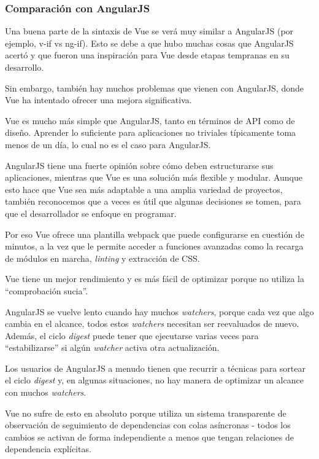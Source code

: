 \subsubsection*{Comparación con AngularJS}
Una buena parte de la sintaxis de Vue se verá muy similar a AngularJS (por ejemplo, v-if vs ng-if). Esto se debe a que hubo muchas cosas que AngularJS acertó y que fueron una inspiración para Vue desde etapas tempranas en su desarrollo.


Sin embargo, también hay muchos problemas que vienen con AngularJS, donde Vue ha intentado ofrecer una mejora significativa.


Vue es mucho más simple que AngularJS, tanto en términos de API como de diseño. Aprender lo suficiente para aplicaciones no triviales típicamente toma menos de un día, lo cual no es el caso para AngularJS.


AngularJS tiene una fuerte opinión sobre cómo deben estructurarse sus aplicaciones, mientras que Vue es una solución más flexible y modular. Aunque esto hace que Vue sea más adaptable a una amplia variedad de proyectos, también reconocemos que a veces es útil que algunas decisiones se tomen, para que el desarrollador se enfoque en programar.


Por eso Vue ofrece una plantilla webpack que puede configurarse en cuestión de minutos, a la vez que le permite acceder a funciones avanzadas como la recarga de módulos en marcha, \textit{linting} y extracción de CSS.


Vue tiene un mejor rendimiento y es más fácil de optimizar porque no utiliza la ``comprobación sucia”. 


AngularJS se vuelve lento cuando hay muchos \textit{watchers}, porque cada vez que algo cambia en el alcance, todos estos \textit{watchers} necesitan ser reevaluados de nuevo. Además, el ciclo \textit{digest} puede tener que ejecutarse varias veces para ``estabilizarse” si algún \textit{watcher} activa otra actualización.


Los usuarios de AngularJS a menudo tienen que recurrir a técnicas para sortear el ciclo \textit{digest} y, en algunas situaciones, no hay manera de optimizar un alcance con muchos \textit{watchers}.



Vue no sufre de esto en absoluto porque utiliza un sistema transparente de observación de seguimiento de dependencias con colas asíncronas - todos los cambios se activan de forma independiente a menos que tengan relaciones de dependencia explícitas.


